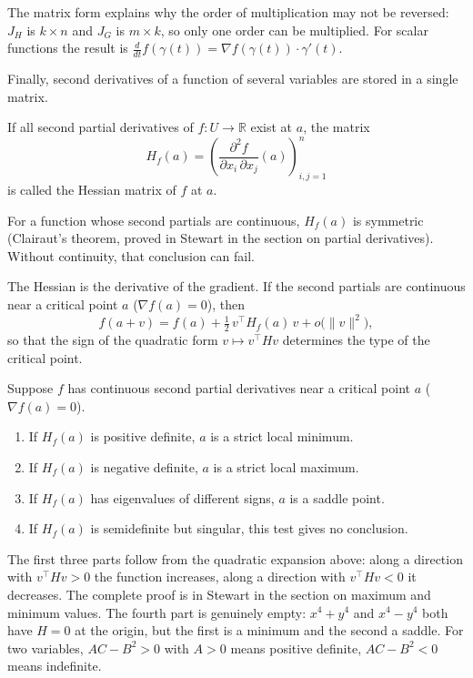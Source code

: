 The matrix form explains why the order of multiplication may not be reversed: $J_{H}$ is
$k\times n$ and $J_{G}$ is $m\times k$, so only one order can be multiplied. For scalar
functions the result is $\frac{d}{dt}f(\gamma(t))=\nabla f(\gamma(t))\cdot
\gamma'(t)$.

Finally, second derivatives of a function of several variables are stored in a single matrix.


\begin{definisi}
If all second partial derivatives of $f\colon U\to\mathbb{R}$ exist at $a$, the matrix
\[
  H_{f}(a)=\left(\frac{\partial^{2}f}{\partial x_{i}\,\partial x_{j}}(a)\right)_{i,j=1}^{n}
\]
is called the Hessian matrix of $f$ at $a$.
\end{definisi}

For a function whose second partials are continuous, $H_{f}(a)$ is symmetric (Clairaut's
theorem, proved in Stewart in the section on partial derivatives). Without continuity, that
conclusion can fail.

The Hessian is the derivative of the gradient. If the second partials are continuous near a
critical point $a$ ($\nabla f(a)=0$), then
\[
  f(a+v)=f(a)+\tfrac12\,v^{\top}H_{f}(a)\,v+o\bigl(\|v\|^{2}\bigr),
\]
so that the sign of the quadratic form $v\mapsto v^{\top}Hv$ determines the type of the
critical point.

\begin{proposisi}
Suppose $f$ has continuous second partial derivatives near a critical point $a$
($\nabla f(a)=0$).
\begin{enumerate}
  \item If $H_{f}(a)$ is positive definite, $a$ is a strict local minimum.
  \item If $H_{f}(a)$ is negative definite, $a$ is a strict local maximum.
  \item If $H_{f}(a)$ has eigenvalues of different signs, $a$ is a saddle point.
  \item If $H_{f}(a)$ is semidefinite but singular, this test gives no conclusion.
\end{enumerate}
\end{proposisi}

The first three parts follow from the quadratic expansion above: along a direction with
$v^{\top}Hv>0$ the function increases, along a direction with $v^{\top}Hv<0$ it decreases. The
complete proof is in Stewart in the section on maximum and minimum values. The fourth part is
genuinely empty: $x^{4}+y^{4}$ and $x^{4}-y^{4}$ both have $H=0$ at the origin, but the first
is a minimum and the second a saddle. For two variables, $AC-B^{2}>0$ with $A>0$ means
positive definite, $AC-B^{2}<0$ means indefinite.
